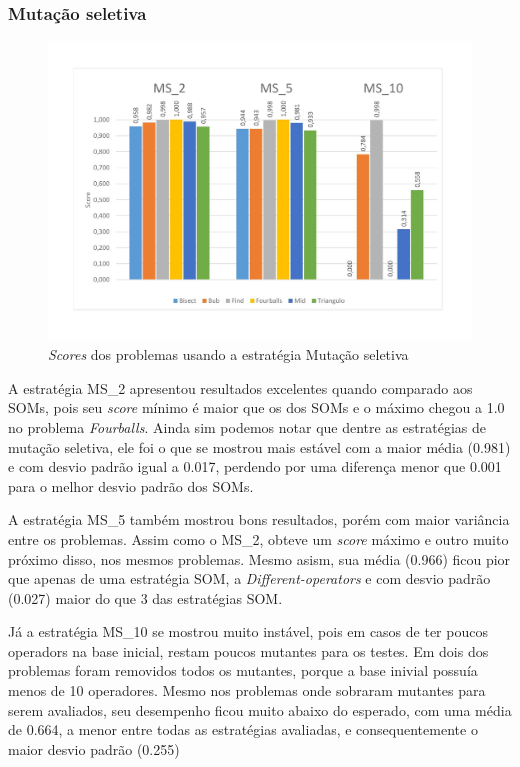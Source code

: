 \subsubsection{Mutação seletiva}
\begin{figure}[H]
\includegraphics[width=1\textwidth]{graficos/strategies/mss.jpg}
\caption{\textit{Scores} dos problemas usando a estratégia Mutação seletiva}
\label{fig:selective}
\end{figure}
A estratégia MS\_2 apresentou resultados excelentes quando comparado aos SOMs, pois seu \textit{score} mínimo é maior que os dos SOMs e o máximo chegou a 1.0 no problema \textit{Fourballs}. Ainda sim podemos notar que dentre as estratégias de mutação seletiva, ele foi o que se mostrou mais estável com a maior média (0.981) e com desvio padrão igual a 0.017, perdendo por uma diferença menor que 0.001 para o melhor desvio padrão dos SOMs.

A estratégia MS\_5 também mostrou bons resultados, porém com maior variância entre os problemas. Assim como o MS\_2, obteve um \textit{score} máximo e outro muito próximo disso, nos mesmos problemas. Mesmo asism, sua média (0.966) ficou pior que apenas de uma estratégia SOM, a \textit{Different-operators} e com desvio padrão (0.027) maior do que 3 das estratégias SOM.

Já a estratégia MS\_10 se mostrou muito instável, pois em casos de ter poucos operadors na base inicial, restam poucos mutantes para os testes. Em dois dos problemas foram removidos todos os mutantes, porque a base inivial possuía menos de 10 operadores. Mesmo nos problemas onde sobraram mutantes para serem avaliados, seu desempenho ficou muito abaixo do esperado, com uma média de 0.664, a menor entre todas as estratégias avaliadas, e consequentemente o maior desvio padrão (0.255)

